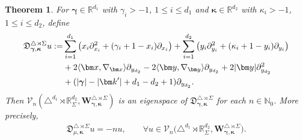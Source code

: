 \documentclass{amsart}
\newtheorem{thm}{Theorem}[section]
\theoremstyle{remark}
\def\la{{\langle}}
\def\ra{{\rangle}}
\def\fD{{\mathfrak D}}
\def\g{{\gamma}}
\def\k{{\kappa}}
\def\la{{\langle}}
\def\ra{{\rangle}}
\def\kb{{\bm k}}
\def\xb{{\bm x}}
\def\yb{{\bm y}}
\def\CV{{\mathcal V}}
\def\NN{{\mathbb N}}
\def\RR{{\mathbb R}}
\def\bg{{\boldsymbol{\gamma}}}
\def\bk{{\boldsymbol{\kappa}}}
\begin{document}
\begin{thm}\label{thm:SigT}
For $\bg \in \RR^{d_1}$ with $\g_i  > -1$, $1\le i \le d_1$ and $\bk \in \RR^{d_2}$ with $\k_i > -1$, $1 \le i \le d_2$, define
\begin{align} \label{eq:SigT}
  \fD_{\bg,\bk}^{\triangle \rtimes \Sigma} u  : =  &
    \sum_{i=1}^{d_1} \left(x_i \partial_{x_i}^2 + (\g_i +1- x_i) \partial_{x_i} \right)  
    + \sum_{i=1}^{d_2} \left( y_i \partial_{y_i}^2 + (\kappa_i +1 - y_i) \partial_{y_i} \right)  \\
   & + 2 \la \xb, \nabla_{\xb} \ra \partial_{y_{d_2}} 
     - 2 \la \bm y, \nabla_{\bm y} \ra \partial_{y_{d_2}} + 2 |\yb| \partial_{y_{d_2}}^2 \notag \\
     & + (|\bg| -|\kb'| +d_1 - d_2 +1) \partial_{y_{d_2}}. \notag
\end{align}
Then $\CV_n(\triangle^{d_1}  \rtimes \RR_\Sigma^{d_2}, \bm W_{\bg, \bk}^{\triangle \rtimes \Sigma})$ is an eigenspace 
of $ \fD_{\bg,\bk}^{\triangle \rtimes \Sigma}$ for each $n \in \NN_0$. More precisely, 
\begin{align} \label{eq:SigT-eigen}
  \fD_{\mu,\bk}^{\triangle \rtimes \Sigma} u = - n  u, \qquad \forall u \in \CV_n\big(\triangle^{d_1}  \rtimes \RR_\Sigma^{d_2}, \bm W_{\bg, \bk}^{\triangle \rtimes \Sigma}\big).
\end{align}
\end{thm}
\end{document}
